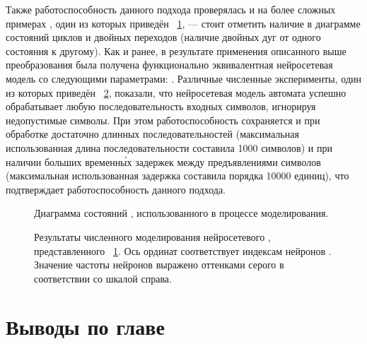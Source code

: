 Также работоспособность данного подхода проверялась и на более сложных примерах , один из которых приведён \onfigure~\ref{img:fsm_model_topology}, --- стоит отметить наличие в диаграмме состояний циклов и двойных переходов (наличие двойных дуг от одного состояния к другому). Как и ранее, в результате применения описанного выше преобразования была получена функционально эквивалентная нейросетевая модель со следующими параметрами: . Различные численные эксперименты, один из которых приведён \onfigure~\ref{img:fsm_model_dynamic}, показали, что нейросетевая модель автомата успешно обрабатывает любую последовательность входных символов, игнорируя недопустимые символы. При этом работоспособность сохраняется и при обработке достаточно длинных последовательностей (максимальная использованная длина последовательности составила 1000 символов) и при наличии больших временн\'{ы}х задержек между предъявлениями символов (максимальная использованная задержка составила порядка 10000 единиц), что подтверждает работоспособность данного подхода.

\begin{figure}[ht]
    \caption{Диаграмма состояний , использованного в процессе моделирования.}
    \label{img:fsm_model_topology}  
\end{figure}

\begin{figure}[ht]
    \caption{Результаты численного моделирования нейросетевого , представленного \onfigure~\ref{img:fsm_model_topology}. Ось ординат соответствует индексам нейронов . Значение частоты нейронов выражено оттенками серого в соответствии со шкалой справа.} 
    \label{img:fsm_model_dynamic}  
\end{figure}

\section{Выводы по главе \thechapter} \label{section:neuron_concls}



